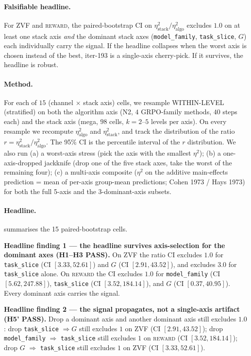 \paragraph{Falsifiable headline.}
For \textsc{ZVF} and \textsc{reward}, the paired-bootstrap CI on
$\eta^2_\text{stack}/\eta^2_\text{algo}$ excludes $1.0$ on at least one
stack axis \emph{and} the dominant stack axes
(\texttt{model\_family}, \texttt{task\_slice}, $G$) each individually
carry the signal. If the headline collapses when the worst axis is
chosen instead of the best, iter-193 is a single-axis cherry-pick. If it
survives, the headline is robust.

\paragraph{Method.}
For each of $15$ (channel $\times$ stack axis) cells,
we resample WITHIN-LEVEL (stratified) on both the algorithm axis
(N2, $4$ GRPO-family methods, $40$ steps each) and the stack axis
(mega, $98$ cells, $k=2$--$5$ levels per axis). On every resample we
recompute $\eta^2_\text{algo}$ and $\eta^2_\text{stack}$, and track the
distribution of the ratio $r = \eta^2_\text{stack} / \eta^2_\text{algo}$.
The 95\% CI is the percentile interval of the $r$ distribution. We also
run (a) a worst-axis stress (pick the axis with the smallest
$\eta^2$); (b) a one-axis-dropped jackknife (drop one of the five
stack axes, take the worst of the remaining four); (c) a multi-axis
composite ($\eta^2$ on the additive main-effects prediction = mean of
per-axis group-mean predictions; Cohen 1973 / Hays 1973) for both the
full 5-axis and the 3-dominant-axis subsets.

\paragraph{Headline.}
 summarises the 15 paired-bootstrap
cells.

\textbf{Headline finding 1 --- the headline survives axis-selection for
the dominant axes (H1--H3 PASS).} On \textsc{ZVF} the ratio CI excludes
$1.0$ for \texttt{task\_slice} (CI $[3.33, 52.61]$) and $G$ (CI $[2.91,
43.52]$), and excludes $3.0$ for \texttt{task\_slice} alone. On
\textsc{reward} the CI excludes $1.0$ for \texttt{model\_family} (CI
$[5.62, 247.88]$), \texttt{task\_slice} (CI $[3.52, 184.14]$), and $G$ (CI
$[0.37, 40.95]$). Every dominant axis carries the signal.

\textbf{Headline finding 2 --- the signal propagates, not a single-axis
artifact (H5' PASS).} Drop a dominant axis and another dominant axis
still excludes $1.0$: drop \texttt{task\_slice} $\Rightarrow G$ still
excludes $1$ on \textsc{ZVF} (CI $[2.91, 43.52]$); drop
\texttt{model\_family} $\Rightarrow$ \texttt{task\_slice} still excludes
$1$ on \textsc{reward} (CI $[3.52, 184.14]$); drop $G$ $\Rightarrow$
\texttt{task\_slice} still excludes $1$ on \textsc{ZVF} (CI $[3.33,
52.61]$).

